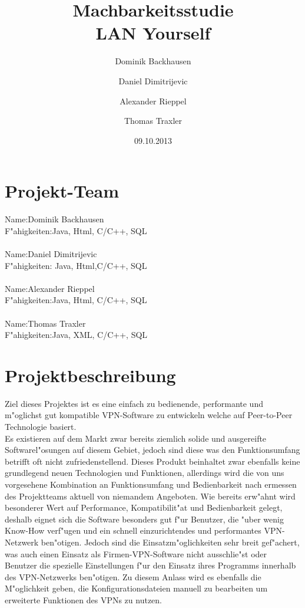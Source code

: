 \documentclass[a4paper,12pt]{scrreprt}
\begin{document}
\author{Dominik Backhausen\and Daniel Dimitrijevic\and Alexander Rieppel\and Thomas Traxler}
\title{Machbarkeitsstudie\\ LAN Yourself}
\date{09.10.2013}
\maketitle
\tableofcontents



\chapter{Projekt-Team}
	
	Name:Dominik Backhausen\\
	    F"ahigkeiten:Java, Html, C/C++, SQL\\\\
	  	Name:Daniel Dimitrijevic
	\\ 	F"ahigkeiten: Java, Html,C/C++, SQL    
	\\
	\\  Name:Alexander Rieppel
	\\
	    F"ahigkeiten:Java, Html, C/C++, SQL
	    \\
	    \\
	    Name:Thomas Traxler
	    \\
	    F"ahigkeiten:Java, XML, C/C++, SQL
	    \\
\chapter{Projektbeschreibung}
Ziel dieses Projektes ist es eine einfach zu bedienende, performante und m"oglichst gut kompatible VPN-Software zu entwickeln welche auf Peer-to-Peer Technologie basiert.\\

Es existieren auf dem Markt zwar bereits ziemlich solide und ausgereifte Softwarel"osungen auf diesem Gebiet, jedoch sind diese was den Funktionsumfang betrifft oft nicht zufriedenstellend. Dieses Produkt beinhaltet zwar ebenfalls keine grundlegend neuen Technologien und Funktionen, allerdings wird die von uns vorgesehene Kombination an Funktionsumfang und Bedienbarkeit nach ermessen des Projektteams aktuell von niemandem Angeboten. Wie bereits erw"ahnt wird besonderer Wert auf Performance, Kompatibilit"at und Bedienbarkeit gelegt, deshalb eignet sich die Software besonders gut f"ur Benutzer, die "uber wenig Know-How verf"ugen und ein schnell einzurichtendes und performantes VPN-Netzwerk ben"otigen. Jedoch sind die Einsatzm"oglichkeiten sehr breit gef"achert, was auch einen Einsatz als Firmen-VPN-Software nicht ausschlie"st oder Benutzer die spezielle Einstellungen f"ur den Einsatz ihres Programms innerhalb des VPN-Netzwerks ben"otigen. Zu diesem Anlass wird es ebenfalls die M"oglichkeit geben, die Konfigurationsdateien manuell zu bearbeiten um erweiterte Funktionen des VPNs zu nutzen.\\
\end{document}
